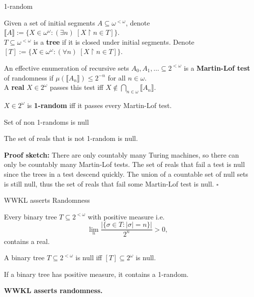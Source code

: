 \begin{frame}{1-random}
  \begin{notation*}
    Given a set of initial segments $A\subseteq\omega^{<\omega}$, denote
    $\llbracket A\rrbracket:= \{X\in\omega^\omega: (\exists n)\;
    [X\restriction n \in T]\}$.\\
    \vspace{0.5em}
    $T\subseteq\omega^{<\omega}$ is a \textbf{tree} if it is closed under
    initial segments. Denote $[T]:= \{X\in\omega^\omega: (\forall n)\;
    [X\restriction n \in T]\}$.
  \end{notation*}

  \begin{define*}
    An effective enumeration of recursive sets
    $A_0,A_1,\ldots \subseteq 2^{<\omega}$ is a \textbf{Martin-Lof test} of
    randomness if $\mu(\llbracket A_n\rrbracket) \leq 2^{-n}$ for all
    $n\in\omega$.\\
    \vspace{0.5em}
    A \textbf{real} $X\in2^\omega$ passes this test iff $X\not\in
    \bigcap_{n\in\omega} \llbracket A_n\rrbracket$.
  \end{define*}

  \begin{define*}
    $X\in2^\omega$ is \textbf{1-random} iff it passes every Martin-Lof
    test.
  \end{define*}
\end{frame}

\begin{frame}{Set of non 1-randoms is null}
  \begin{fact*}
    The set of reals that is not 1-random is null.
  \end{fact*}

  \vspace{2em}
  \textbf{Proof sketch:} There are only countably many Turing machines, so
  there can only be countably many Martin-Lof tests. The set of reals that
  fail a test is null since the trees in a test descend quickly. The union
  of a countable set of null sets is still null, thus the set of reals that
  fail some Martin-Lof test is null. $\square$
\end{frame}

\begin{frame}{WWKL asserts Randomness}
  \begin{thm*}
    Every binary tree $T\subseteq 2^{<\omega}$ with positive measure i.e.
    \[\lim_n \frac{|\{\sigma\in T: |\sigma|=n\}|}{2^n} >0,\]
    contains a real.
  \end{thm*}
  \begin{fact}
    A binary tree $T\subseteq2^{<\omega}$ is null iff
    $[T]\subseteq2^\omega$ is null.
  \end{fact}
  \begin{coro}
    If a binary tree has positive measure, it contains a 1-random.
  \end{coro}

  \textbf{WWKL asserts randomness.}
\end{frame}

